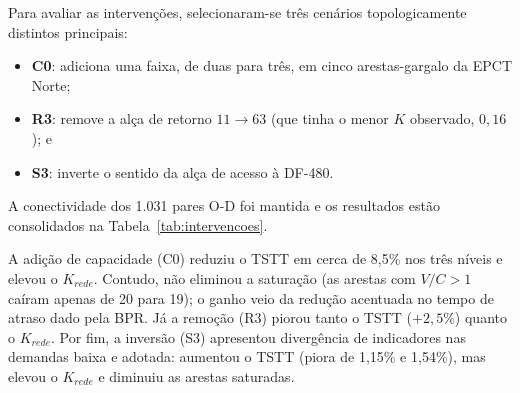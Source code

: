\documentclass[portuguese]{sbc2025}%
\begin{document}
Para avaliar as intervenções, selecionaram-se três cenários topologicamente distintos principais: 
\begin{itemize}
    \item \textbf{C0}: adiciona uma faixa, de duas para três, em cinco arestas-gargalo da EPCT Norte;
    \item \textbf{R3}: remove a alça de retorno $11\rightarrow63$ (que tinha o menor $K$ observado, $0{,}16$); e
    \item \textbf{S3}: inverte o sentido da alça de acesso à DF-480.
\end{itemize}
A conectividade dos 1.031 pares O-D foi mantida e os resultados estão consolidados na Tabela~\ref{tab:intervencoes}.

\begin{table}[htbp]
\caption{Impacto das três intervenções em relação à situação atual}
\label{tab:intervencoes}
\centering
{}
\end{table}

A adição de capacidade (C0) reduziu o TSTT em cerca de 8,5\% nos três níveis e elevou o $K_{rede}$. Contudo, não eliminou a saturação (as arestas com $V/C>1$ caíram apenas de 20 para 19); o ganho veio da redução acentuada no tempo de atraso dado pela BPR. Já a remoção (R3) piorou tanto o TSTT ($+2{,}5\%$) quanto o $K_{rede}$. Por fim, a inversão (S3) apresentou divergência de indicadores nas demandas baixa e adotada: aumentou o TSTT (piora de 1,15\% e 1,54\%), mas elevou o $K_{rede}$ e diminuiu as arestas saturadas. 
\end{document}
